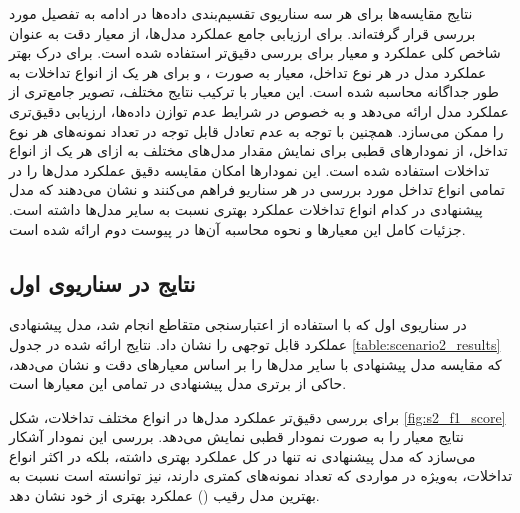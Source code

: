 نتایج مقایسه‌ها برای هر سه سناریوی تقسیم‌بندی داده‌ها در ادامه به تفصیل مورد بررسی قرار گرفته‌اند. برای ارزیابی جامع عملکرد مدل‌ها، از معیار دقت به عنوان شاخص کلی عملکرد و معیار  برای بررسی دقیق‌تر استفاده شده است. برای درک بهتر عملکرد مدل در هر نوع تداخل، معیار  به صورت ،  و  برای هر یک از انواع تداخلات به طور جداگانه محاسبه شده است. این معیار با ترکیب نتایج مختلف، تصویر جامع‌تری از عملکرد مدل ارائه می‌دهد و به خصوص در شرایط عدم توازن داده‌ها، ارزیابی دقیق‌تری را ممکن می‌سازد. همچنین با توجه به عدم تعادل قابل توجه در تعداد نمونه‌های هر نوع تداخل، از نمودارهای قطبی برای نمایش مقدار  مدل‌های مختلف به ازای هر یک از انواع تداخلات استفاده شده است. این نمودارها امکان مقایسه دقیق عملکرد مدل‌ها را در تمامی انواع تداخل مورد بررسی در هر سناریو فراهم می‌کنند و نشان می‌دهند که مدل پیشنهادی در کدام انواع تداخلات عملکرد بهتری نسبت به سایر مدل‌ها داشته است. جزئیات کامل این معیارها و نحوه محاسبه آن‌ها در پیوست دوم ارائه شده است.

\subsection{نتایج در سناریوی اول}

در سناریوی اول که با استفاده از اعتبارسنجی متقاطع  انجام شد، مدل پیشنهادی عملکرد قابل توجهی را نشان داد. نتایج ارائه شده در جدول \ref{table:scenario2_results} که مقایسه مدل پیشنهادی با سایر مدل‌ها را بر اساس معیارهای دقت و  نشان می‌دهد، حاکی از برتری مدل پیشنهادی در تمامی این معیارها است.

برای بررسی دقیق‌تر عملکرد مدل‌ها در انواع مختلف تداخلات، شکل \ref{fig:s2_f1_score} نتایج معیار  را به صورت نمودار قطبی نمایش می‌دهد. بررسی این نمودار آشکار می‌سازد که مدل پیشنهادی نه تنها در کل عملکرد بهتری داشته، بلکه در اکثر انواع تداخلات، به‌ویژه در مواردی که تعداد نمونه‌های کمتری دارند، نیز توانسته است نسبت به بهترین مدل رقیب () عملکرد بهتری از خود نشان دهد.

